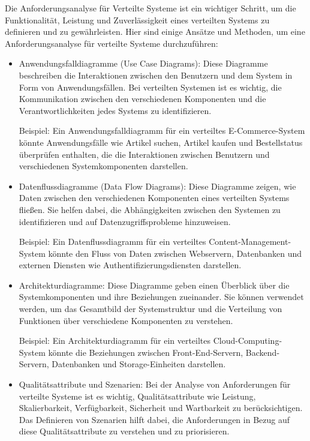 \documentclass[../vs-script-first-v01.tex]{subfiles}
\begin{document}
Die Anforderungsanalyse für Verteilte Systeme ist ein wichtiger Schritt, um die Funktionalität, Leistung und Zuverlässigkeit eines verteilten Systems zu definieren und zu gewährleisten. Hier sind einige Ansätze und Methoden, um eine Anforderungsanalyse für verteilte Systeme durchzuführen:
\begin{itemize}  
\item Anwendungsfalldiagramme (Use Case Diagrams): Diese Diagramme beschreiben die Interaktionen zwischen den Benutzern und dem System in Form von Anwendungsfällen. Bei verteilten Systemen ist es wichtig, die Kommunikation zwischen den verschiedenen Komponenten und die Verantwortlichkeiten jedes Systems zu identifizieren.

Beispiel: Ein Anwendungsfalldiagramm für ein verteiltes E-Commerce-System könnte Anwendungsfälle wie Artikel suchen, Artikel kaufen und Bestellstatus überprüfen enthalten, die die Interaktionen zwischen Benutzern und verschiedenen Systemkomponenten darstellen.

\item Datenflussdiagramme (Data Flow Diagrams): Diese Diagramme zeigen, wie Daten zwischen den verschiedenen Komponenten eines verteilten Systems fließen. Sie helfen dabei, die Abhängigkeiten zwischen den Systemen zu identifizieren und auf Datenzugriffsprobleme hinzuweisen.

Beispiel: Ein Datenflussdiagramm für ein verteiltes Content-Management-System könnte den Fluss von Daten zwischen Webservern, Datenbanken und externen Diensten wie Authentifizierungsdiensten darstellen.

\item Architekturdiagramme: Diese Diagramme geben einen Überblick über die Systemkomponenten und ihre Beziehungen zueinander. Sie können verwendet werden, um das Gesamtbild der Systemstruktur und die Verteilung von Funktionen über verschiedene Komponenten zu verstehen.

Beispiel: Ein Architekturdiagramm für ein verteiltes Cloud-Computing-System könnte die Beziehungen zwischen Front-End-Servern, Backend-Servern, Datenbanken und Storage-Einheiten darstellen.

\item Qualitätsattribute und Szenarien: Bei der Analyse von Anforderungen für verteilte Systeme ist es wichtig, Qualitätsattribute wie Leistung, Skalierbarkeit, Verfügbarkeit, Sicherheit und Wartbarkeit zu berücksichtigen. Das Definieren von Szenarien hilft dabei, die Anforderungen in Bezug auf diese Qualitätsattribute zu verstehen und zu priorisieren.


\end{itemize}
\end{document}
